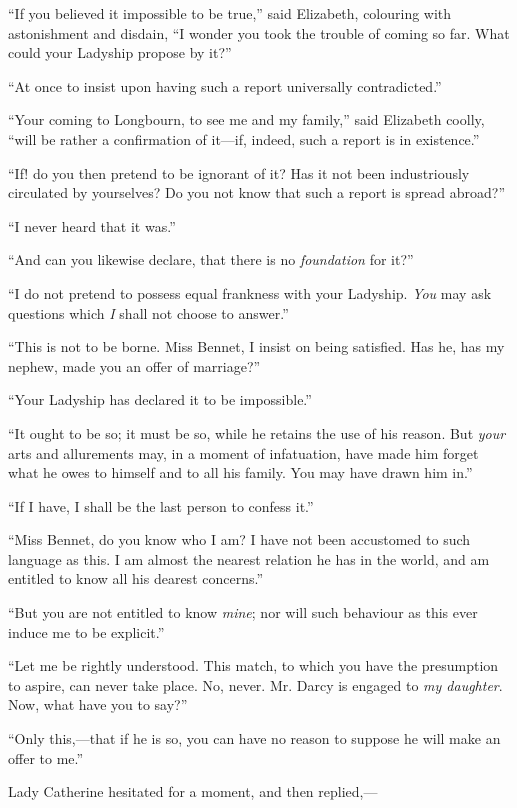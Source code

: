 \documentclass[12pt]{book}
\begin{document}
``If you believed it impossible to be true,'' said Elizabeth, colouring with astonishment and disdain, ``I wonder you took the trouble of coming so far. What could your Ladyship propose by it?''

``At once to insist upon having such a report universally contradicted.''

``Your coming to Longbourn, to see me and my family,'' said Elizabeth coolly, ``will be rather a confirmation of it---if, indeed, such a report is in existence.''

``If! do you then pretend to be ignorant of it? Has it not been industriously circulated by yourselves? Do you not know that such a report is spread abroad?''

``I never heard that it was.''

``And can you likewise declare, that there is no \textit{foundation} for it?''

``I do not pretend to possess equal frankness with your Ladyship. \textit{You} may ask questions which \textit{I} shall not choose to answer.''

``This is not to be borne. Miss Bennet, I insist on being satisfied. Has he, has my nephew, made you an offer of marriage?''

``Your Ladyship has declared it to be impossible.''

``It ought to be so; it must be so, while he retains the use of his reason. But \textit{your} arts and allurements may, in a moment of infatuation, have made him forget what he owes to himself and to all his family. You may have drawn him in.''

``If I have, I shall be the last person to confess it.''

``Miss Bennet, do you know who I am? I have not been accustomed to such language as this. I am almost the nearest relation he has in the world, and am entitled to know all his dearest concerns.''

``But you are not entitled to know \textit{mine}; nor will such behaviour as this ever induce me to be explicit.''

``Let me be rightly understood. This match, to which you have the presumption to aspire, can never take place. No, never. Mr. Darcy is engaged to \textit{my daughter}. Now, what have you to say?''

``Only this,---that if he is so, you can have no reason to suppose he will make an offer to me.''

Lady Catherine hesitated for a moment, and then replied,---
\end{document}
